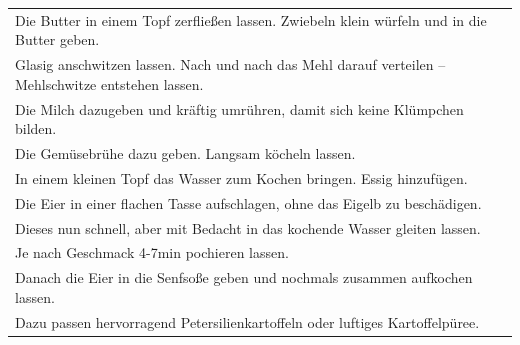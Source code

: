 \begin{tabular}{p{15cm}}
	\\
  Die Butter in einem Topf zerfließen lassen. Zwiebeln klein würfeln und in die Butter geben.\\
  Glasig anschwitzen lassen. Nach und nach das Mehl darauf verteilen – Mehlschwitze entstehen lassen.\\
  Die Milch dazugeben und kräftig umrühren, damit sich keine Klümpchen bilden.\\
  Die Gemüsebrühe dazu geben. Langsam köcheln lassen.\\
  In einem kleinen Topf das Wasser zum Kochen bringen. Essig hinzufügen.\\
  Die Eier in einer flachen Tasse aufschlagen, ohne das Eigelb zu beschädigen.\\
  Dieses nun schnell, aber mit Bedacht in das kochende Wasser gleiten lassen.\\
  Je nach Geschmack 4-7min pochieren lassen.\\
  Danach die Eier in die Senfsoße geben und nochmals zusammen aufkochen lassen.\\
  Dazu passen hervorragend Petersilienkartoffeln oder luftiges Kartoffelpüree.
\end{tabular}
